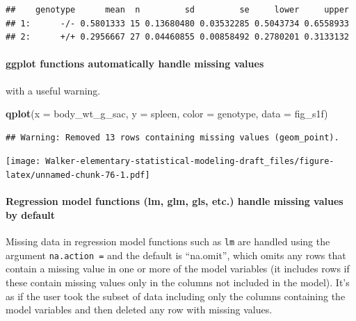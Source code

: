 \documentclass[]{book}
\newenvironment{Shaded}{\begin{snugshade}}{\end{snugshade}}
\newcommand{\DataTypeTok}[1]{\textcolor[rgb]{0.13,0.29,0.53}{#1}}
\newcommand{\KeywordTok}[1]{\textcolor[rgb]{0.13,0.29,0.53}{\textbf{#1}}}
\newcommand{\NormalTok}[1]{#1}
\let\oldparagraph\paragraph
\renewcommand{\paragraph}[1]{\oldparagraph{#1}\mbox{}}
\begin{document}
\begin{verbatim}
##    genotype      mean  n         sd         se     lower     upper
## 1:      -/- 0.5801333 15 0.13680480 0.03532285 0.5043734 0.6558933
## 2:      +/+ 0.2956667 27 0.04460855 0.00858492 0.2780201 0.3133132
\end{verbatim}

\hypertarget{ggplot-functions-automatically-handle-missing-values}{%
\paragraph{ggplot functions automatically handle missing values}\label{ggplot-functions-automatically-handle-missing-values}}

with a useful warning.

\begin{Shaded}
\begin{Highlighting}[]
\KeywordTok{qplot}\NormalTok{(}\DataTypeTok{x =}\NormalTok{ body_wt_g_sac,}
      \DataTypeTok{y =}\NormalTok{ spleen,}
      \DataTypeTok{color =}\NormalTok{ genotype,}
      \DataTypeTok{data =}\NormalTok{ fig_s1f)}
\end{Highlighting}
\end{Shaded}

\begin{verbatim}
## Warning: Removed 13 rows containing missing values (geom_point).
\end{verbatim}

\texttt{[image: Walker-elementary-statistical-modeling-draft\_files/figure-latex/unnamed-chunk-76-1.pdf]}

\hypertarget{regression-model-functions-lm-glm-gls-etc.-handle-missing-values-by-default}{%
\paragraph{Regression model functions (lm, glm, gls, etc.) handle missing values by default}\label{regression-model-functions-lm-glm-gls-etc.-handle-missing-values-by-default}}

Missing data in regression model functions such as \texttt{lm} are handled using the argument \texttt{na.action\ =} and the default is ``na.omit'', which omits any rows that contain a missing value in one or more of the model variables (it includes rows if these contain missing values only in the columns not included in the model). It's as if the user took the subset of data including only the columns containing the model variables and then deleted any row with missing values.
\end{document}
